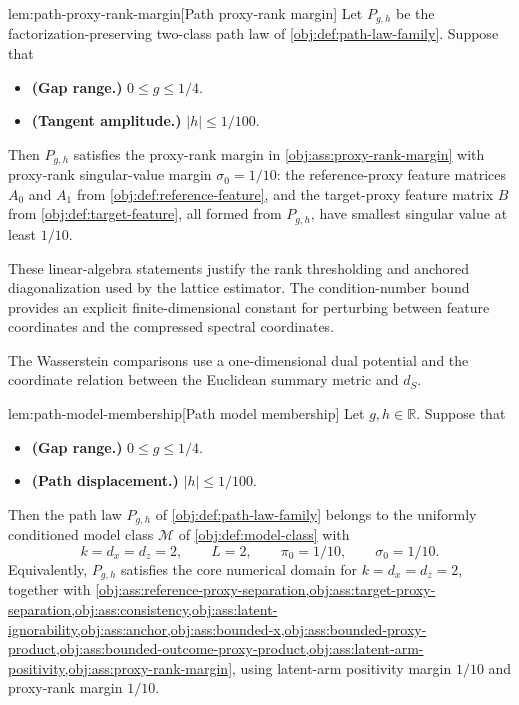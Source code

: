 \begin{lemmav}{lem:path-proxy-rank-margin}[Path proxy-rank margin]
Let \(P_{g,h}\) be the factorization-preserving two-class path law of \cref{obj:def:path-law-family}. Suppose that
\begin{itemize}
\item \textbf{(Gap range.)} \(0\le g\le 1/4\).
\item \textbf{(Tangent amplitude.)} \(|h|\le 1/100\).
\end{itemize}
Then \(P_{g,h}\) satisfies the proxy-rank margin in \cref{obj:ass:proxy-rank-margin} with proxy-rank singular-value margin \(\sigma_0=1/10\): the reference-proxy feature matrices \(A_0\) and \(A_1\) from \cref{obj:def:reference-feature}, and the target-proxy feature matrix \(B\) from \cref{obj:def:target-feature}, all formed from \(P_{g,h}\), have smallest singular value at least \(1/10\).
\end{lemmav}

These linear-algebra statements justify the rank thresholding and anchored diagonalization used by the lattice estimator. The condition-number bound provides an explicit finite-dimensional constant for perturbing between feature coordinates and the compressed spectral coordinates.

The Wasserstein comparisons use a one-dimensional dual potential and the coordinate relation between the Euclidean summary metric and \(d_S\).

\begin{lemmav}{lem:path-model-membership}[Path model membership]
Let \(g,h\in\mathbb R\). Suppose that
\begin{itemize}
\item \textbf{(Gap range.)} \(0\le g\le 1/4\).
\item \textbf{(Path displacement.)} \(|h|\le 1/100\).
\end{itemize}
Then the path law \(P_{g,h}\) of \cref{obj:def:path-law-family} belongs to the uniformly conditioned model class \(\mathcal M\) of \cref{obj:def:model-class} with
\[
k=d_x=d_z=2,\qquad L=2,\qquad \pi_0=1/10,\qquad \sigma_0=1/10 .
\]
Equivalently, \(P_{g,h}\) satisfies the core numerical domain for \(k=d_x=d_z=2\), together with \cref{obj:ass:reference-proxy-separation,obj:ass:target-proxy-separation,obj:ass:consistency,obj:ass:latent-ignorability,obj:ass:anchor,obj:ass:bounded-x,obj:ass:bounded-proxy-product,obj:ass:bounded-outcome-proxy-product,obj:ass:latent-arm-positivity,obj:ass:proxy-rank-margin}, using latent-arm positivity margin \(1/10\) and proxy-rank margin \(1/10\).
\end{lemmav}

